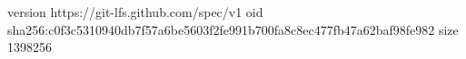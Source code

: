 version https://git-lfs.github.com/spec/v1
oid sha256:c0f3c5310940db7f57a6be5603f2fe991b700fa8c8ec477fb47a62baf98fe982
size 1398256

